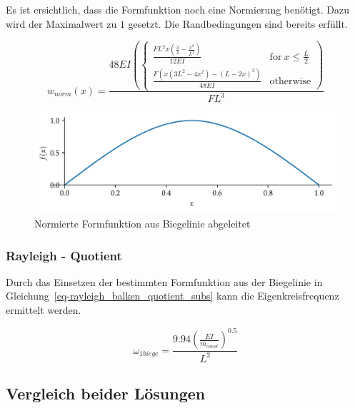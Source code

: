 \documentclass[
  letterpaper,
  DIV=11]{scrreprt}
\begin{document}
Es ist ersichtlich, dass die Formfunktion noch eine Normierung benötigt.
Dazu wird der Maximalwert zu \(1\) gesetzt. Die Randbedingungen sind
bereits erfüllt.

\begin{equation}w_{norm}{\left(x \right)} = \frac{48 E I \left(\begin{cases} \frac{F L^{2} x \left(\frac{3}{4} - \frac{x^{2}}{L^{2}}\right)}{12 E I} & \text{for}\: x \leq \frac{L}{2} \\\frac{F \left(x \left(3 L^{2} - 4 x^{2}\right) - \left(L - 2 x\right)^{3}\right)}{48 E I} & \text{otherwise} \end{cases}\right)}{F L^{3}}\end{equation}

\begin{figure}[H]

{\centering \includegraphics{index_files/mediabag/rayleigh_03_files/figure-pdf/fig-formfunktion_biege_norm-output-1.pdf}

}

\caption{\label{fig-formfunktion_biege_norm}Normierte Formfunktion aus
Biegelinie abgeleitet}

\end{figure}

\hypertarget{rayleigh---quotient-2}{%
\subsubsection{Rayleigh - Quotient}\label{rayleigh---quotient-2}}

Durch das Einsetzen der bestimmten Formfunktion aus der Biegelinie in
Gleichung~\ref{eq-rayleigh_balken_quotient_subs} kann die
Eigenkreisfrequenz ermittelt werden.

\begin{equation}\omega_{1 biege} = \frac{9.94 \left(\frac{E I}{m_{const}}\right)^{0.5}}{L^{2}}\end{equation}

\hypertarget{vergleich-beider-luxf6sungen}{%
\subsection{Vergleich beider
Lösungen}\label{vergleich-beider-luxf6sungen}}
\end{document}
